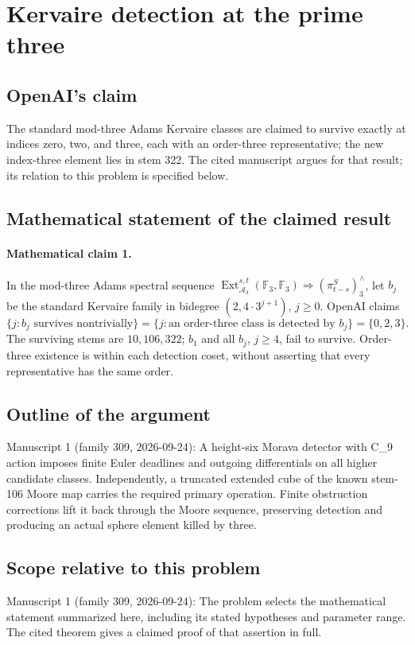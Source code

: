 \documentclass[11pt]{article}
\begin{document}
\section*{Kervaire detection at the prime three}

\subsection{OpenAI's claim}
The standard mod-three Adams Kervaire classes are claimed to survive exactly at indices zero, two, and three, each with an order-three representative; the new index-three element lies in stem 322. The cited manuscript argues for that result; its relation to this problem is specified below.

\subsection{Mathematical statement of the claimed result}
\paragraph{Mathematical claim 1.} In the mod-three Adams spectral sequence $\operatorname{Ext}_{\mathcal A_3}^{s,t}(\mathbb F_3,\mathbb F_3)\Rightarrow(\pi^S_{t-s})_3^\wedge$, let $b_j$ be the standard Kervaire family in bidegree $(2,4\cdot3^{j+1})$, $j\ge0$. OpenAI claims
\[
\{j:b_j\text{ survives nontrivially}\}
=\{j:\text{an order-three class is detected by }b_j\}
=\{0,2,3\}.
\]
The surviving stems are $10,106,322$; $b_1$ and all $b_j$, $j\ge4$, fail to survive. Order-three existence is within each detection coset, without asserting that every representative has the same order.

\subsection{Outline of the argument}
Manuscript 1 (family 309, 2026-09-24): A height-six Morava detector with C\_9 action imposes finite Euler deadlines and outgoing differentials on all higher candidate classes. Independently, a truncated extended cube of the known stem-106 Moore map carries the required primary operation. Finite obstruction corrections lift it back through the Moore sequence, preserving detection and producing an actual sphere element killed by three.

\subsection{Scope relative to this problem}
Manuscript 1 (family 309, 2026-09-24): The problem selects the mathematical statement summarized here, including its stated hypotheses and parameter range. The cited theorem gives a claimed proof of that assertion in full.
\end{document}
